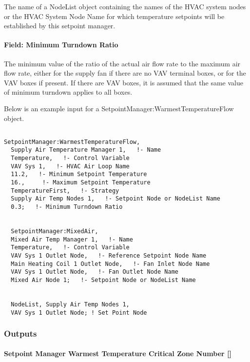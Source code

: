 The name of a NodeList object containing the names of the HVAC system nodes or the HVAC System Node Name for which temperature setpoints will be established by this setpoint manager.

\paragraph{Field: Minimum Turndown Ratio}\label{field-minimum-turndown-ratio}

The minimum value of the ratio of the actual air flow rate to the maximum air flow rate, either for the supply fan if there are no VAV terminal boxes, or for the VAV boxes if present. If there are VAV boxes, it is assumed that the same value of minimum turndown applies to all boxes.

Below is an example input for a SetpointManager:WarmestTemperatureFlow object.

\begin{lstlisting}

SetpointManager:WarmestTemperatureFlow,
  Supply Air Temperature Manager 1,   !- Name
  Temperature,   !- Control Variable
  VAV Sys 1,   !- HVAC Air Loop Name
  11.2,   !- Minimum Setpoint Temperature
  16.,     !- Maximum Setpoint Temperature
  TemperatureFirst,   !- Strategy
  Supply Air Temp Nodes 1,   !- Setpoint Node or NodeList Name
  0.3;   !- Minimum Turndown Ratio


  SetpointManager:MixedAir,
  Mixed Air Temp Manager 1,   !- Name
  Temperature,   !- Control Variable
  VAV Sys 1 Outlet Node,   !- Reference Setpoint Node Name
  Main Heating Coil 1 Outlet Node,   !- Fan Inlet Node Name
  VAV Sys 1 Outlet Node,   !- Fan Outlet Node Name
  Mixed Air Node 1;   !- Setpoint Node or NodeList Name


  NodeList, Supply Air Temp Nodes 1,
  VAV Sys 1 Outlet Node; ! Set Point Node
\end{lstlisting}

\subsubsection{Outputs}\label{outputs-032}

\paragraph{Setpoint Manager Warmest Temperature Critical Zone Number {[]}}\label{setpoint-manager-warmest-temperature-critical-zone-number}

